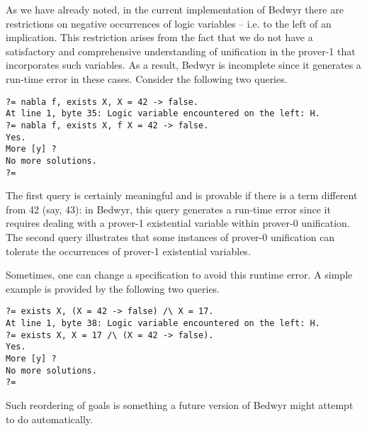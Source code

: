As we have already noted, in the current implementation of Bedwyr there are
restrictions on negative occurrences of logic variables -- i.e. to the left of
an implication.  This restriction arises from the fact that we do not have a
satisfactory and comprehensive understanding of unification in the prover-1
that incorporates such variables.  As a result, Bedwyr is incomplete since it
generates a run-time error in these cases.  Consider the following two
queries.
\begin{center}\begin{lstlisting}[style=bedwyr-repl]
?= nabla f, exists X, X = 42 -> false.
At line 1, byte 35: Logic variable encountered on the left: H.
?= nabla f, exists X, f X = 42 -> false.
Yes.
More [y] ?
No more solutions.
?=
\end{lstlisting}\end{center}
The first query is certainly meaningful and is provable if there is a term
different from 42 (say, 43): in Bedwyr, this query generates a run-time error
since it requires dealing with a prover-1 existential variable within prover-0
unification. The second query illustrates that some instances of prover-0
unification can tolerate the occurrences of prover-1 existential variables.

Sometimes, one can change a specification to avoid this runtime error.  A
simple example is provided by the following two queries.
\begin{center}\begin{lstlisting}[style=bedwyr-repl]
?= exists X, (X = 42 -> false) /\ X = 17.
At line 1, byte 38: Logic variable encountered on the left: H.
?= exists X, X = 17 /\ (X = 42 -> false).
Yes.
More [y] ?
No more solutions.
?=
\end{lstlisting}\end{center}
Such reordering of goals is something a future version of Bedwyr might attempt
to do automatically.
